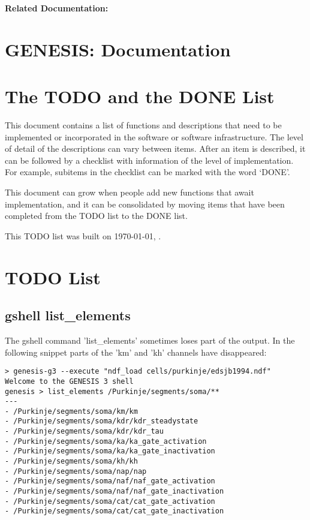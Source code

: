 \documentclass[12pt]{article}
\begin{document}
{\bf Related Documentation:}

\section*{GENESIS: Documentation}

\section{The TODO and the DONE List}

This document contains a list of functions and descriptions that need
to be implemented or incorporated in the software or software
infrastructure.  The level of detail of the descriptions can vary
between items.  After an item is described, it can be followed by a
checklist with information of the level of implementation.  For
example, subitems in the checklist can be marked with the word `DONE'.

This document can grow when people add new functions that await
implementation, and it can be consolidated by moving items that have
been completed from the TODO list to the DONE list.

This TODO list was built on \today, \thistime.


\section{TODO List}

\subsection{gshell list\_elements}

The gshell command 'list\_elements' sometimes loses part of the
output.  In the following snippet parts of the 'km' and 'kh' channels
have disappeared:


\begin{verbatim}
> genesis-g3 --execute "ndf_load cells/purkinje/edsjb1994.ndf"
Welcome to the GENESIS 3 shell
genesis > list_elements /Purkinje/segments/soma/**
---
- /Purkinje/segments/soma/km/km
- /Purkinje/segments/soma/kdr/kdr_steadystate
- /Purkinje/segments/soma/kdr/kdr_tau
- /Purkinje/segments/soma/ka/ka_gate_activation
- /Purkinje/segments/soma/ka/ka_gate_inactivation
- /Purkinje/segments/soma/kh/kh
- /Purkinje/segments/soma/nap/nap
- /Purkinje/segments/soma/naf/naf_gate_activation
- /Purkinje/segments/soma/naf/naf_gate_inactivation
- /Purkinje/segments/soma/cat/cat_gate_activation
- /Purkinje/segments/soma/cat/cat_gate_inactivation
\end{verbatim}
\end{document}
